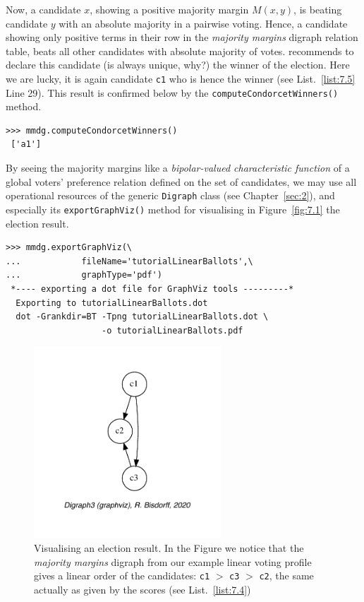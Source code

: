 Now, a candidate $x$, showing a positive majority margin $M(x,y)$, is beating candidate $y$  with an absolute majority in a pairwise voting. Hence, a candidate showing only positive terms in their row in the \emph{majority margins} digraph relation table, beats all other candidates with absolute majority of votes. \Condorcet recommends to declare this candidate (is always unique, why?) the winner of the election. Here we are lucky, it is again candidate \texttt{c1} who is hence the \Condorcet winner (see List.~\vref{list:7.5} Line 29). This result is confirmed below by the \texttt{computeCondorcetWinners()} method. 
\begin{lstlisting}
>>> mmdg.computeCondorcetWinners()
 ['a1']  
\end{lstlisting}    

By seeing the majority margins like a \emph{bipolar-valued characteristic function} of a global voters' preference relation defined on the set of candidates, we may use all operational resources of the generic \texttt{Digraph} class (see Chapter~\ref{sec:2}), and especially its \texttt{exportGraphViz()} method for visualising in Figure~\vref{fig:7.1} the election result.
\begin{lstlisting}
>>> mmdg.exportGraphViz(\
...            fileName='tutorialLinearBallots',\
...            graphType='pdf')
 *---- exporting a dot file for GraphViz tools ---------*
  Exporting to tutorialLinearBallots.dot
  dot -Grankdir=BT -Tpng tutorialLinearBallots.dot \
                   -o tutorialLinearBallots.pdf
\end{lstlisting}
\begin{figure}[ht]
\sidecaption[t]
\includegraphics[width=7cm]{Figures/7-1-tutorialBallots.pdf}
\caption{Visualising an election result. In the Figure we notice that the \emph{majority margins} digraph from our example linear voting profile gives a linear order of the candidates: \texttt{c1} $>$ \texttt{c3} $>$ \texttt{c2}, the same actually as given by the \Borda scores (see List.~\vref{list:7.4})}
\label{fig:7.1}       %
\end{figure}

